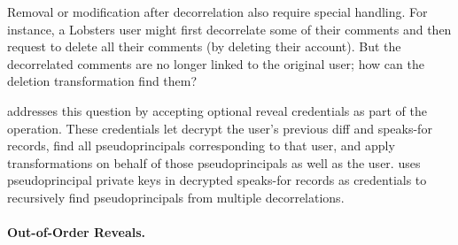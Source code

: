 %
%

Removal or modification after decorrelation also require special handling. For
instance, a Lobsters user might first decorrelate some of their comments and
then request to delete all their comments (\eg by deleting their account).
%
But the decorrelated comments are no
longer linked to the original user; how can the deletion transformation find
them?
%

%
\sys addresses this question by accepting optional reveal credentials as part of
the \xx operation.
%
These credentials let \sys decrypt the user's previous diff and speaks-for
records, find all pseudoprincipals corresponding to that user, and apply \xxing
transformations on behalf of those pseudoprincipals as well as the user.
%
\sys uses pseudoprincipal private keys in decrypted speaks-for records as
credentials to recursively find pseudoprincipals from multiple decorrelations.

%
%

\paragraph{Out-of-Order Reveals.}
\label{s:design:oooreveals}

